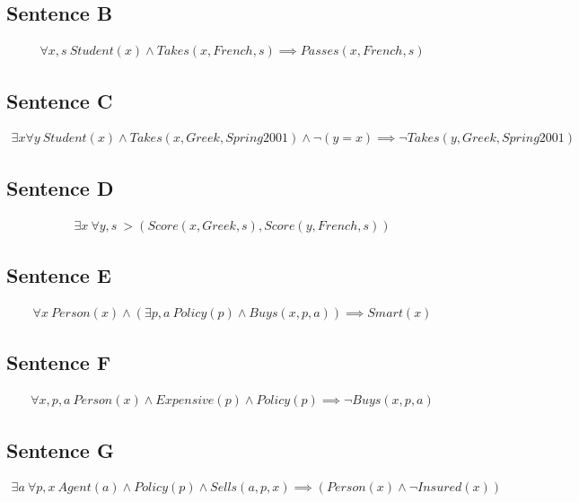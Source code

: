 \subsection*{Sentence B}

\begin{gather*}
\forall x, s \ Student(x) \land Takes(x, French, s) \implies Passes(x, French, s)
\end{gather*}

\subsection*{Sentence C}

\begin{gather*}
\exists x \forall y \ Student(x) \land Takes(x, Greek, Spring2001) \land \neg (y=x) \implies \neg Takes(y, Greek, Spring2001)
\end{gather*}

\subsection*{Sentence D}

\begin{gather*}
\exists x \ \forall y, s \ >(Score(x, Greek, s), Score(y, French, s)) 
\end{gather*}

\subsection*{Sentence E}

\begin{gather*}
\forall x \ Person(x) \land (\exists p, a \ Policy(p) \land Buys(x, p, a)) \implies Smart(x)
\end{gather*}

\subsection*{Sentence F}

\begin{gather*}
\forall x, p, a \ Person(x) \land Expensive(p) \land Policy(p) \implies \neg Buys(x, p, a)
\end{gather*}

\subsection*{Sentence G}

\begin{gather*}
\exists a \ \forall p, x \ Agent(a) \land Policy(p) \land Sells(a, p, x) \implies (Person(x) \land \neg Insured(x))
\end{gather*}

